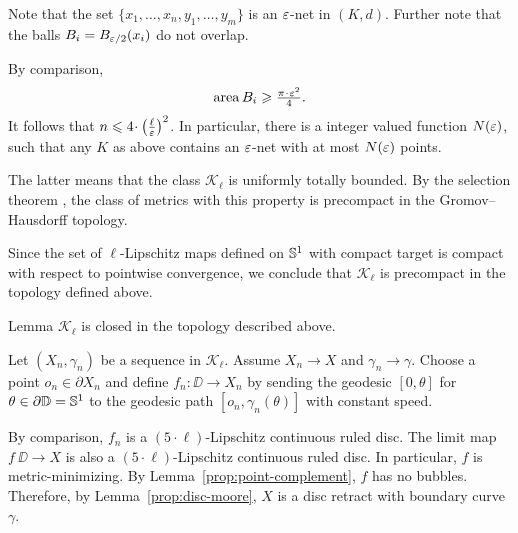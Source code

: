 Note that the set $\{x_1,\dots,x_n,y_1,\dots,y_m\}$
is an $\varepsilon$-net in $(K,d)$.
Further note that the balls $B_i=B_{\varepsilon/2}(x_i)$
do not overlap.

By comparison,
\[\area B_i\ge \tfrac{\pi\cdot\eps^2}{4}.\]
It follows that $n\le 4\cdot\left(\tfrac\ell\eps\right)^2$.
In particular, there is a integer valued function $N(\varepsilon)$, such that any  
$K$ as above contains an $\varepsilon$-net
with at most $N(\varepsilon)$ points.

The latter means that the class $\mathcal{K}_\ell$ is uniformly totally bounded.
By the selection theorem \cite[7.4.15]{BBI}, the class of metrics with this property is precompact in the Gromov--Hausdorff topology.

Since the set of $\ell$-Lipschitz maps defined on $\mathbb{S}^1$ with compact target is compact 
with respect to pointwise convergence, we conclude that $\mathcal{K}_\ell$ is precompact in the topology defined above. 
\qeds





\begin{thm}{Lemma}\label{lem:closed}
$\mathcal{K}_\ell$ is closed in the topology described above.
\end{thm}

Let $(X_n,\gamma_n)$ be a sequence in $\mathcal{K}_\ell$.
Assume $X_n\to X$ and $\gamma_n\to\gamma$. 
Choose a point $o_n\in \partial X_n$ and define
$f_n:\DD\to X_n$ by sending the geodesic $[0,\theta]$ for $\theta\in\partial \mathbb{D}=\mathbb{S}^1$ to the geodesic path $[o_n,\gamma_n(\theta)]$ with constant speed. 

By comparison, $f_n$ is a $(5\cdot\ell)$-Lipschitz continuous ruled disc. %
The limit map $f\:\DD\to X$ is also a $(5\cdot\ell)$-Lipschitz continuous ruled disc.
In particular, $f$ is metric-minimizing.
By Lemma~\ref{prop:point-complement}, $f$ has no bubbles.
Therefore, by Lemma~\ref{prop:disc-moore}, $X$ is a disc retract with boundary curve $\gamma$.
\qeds
